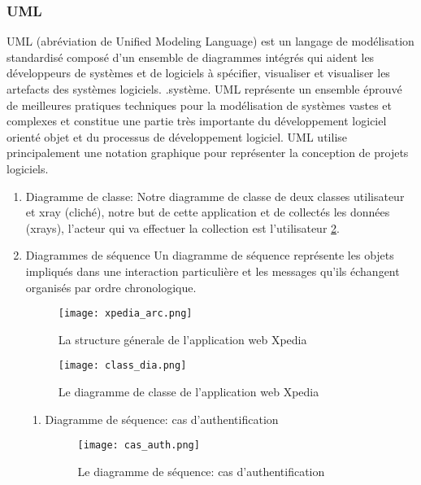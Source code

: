         \subsubsection{UML}
            UML (abréviation de Unified Modeling Language) est un langage de modélisation standardisé composé d'un ensemble de diagrammes intégrés qui aident les développeurs de systèmes et de logiciels à spécifier, visualiser et visualiser les artefacts des systèmes logiciels. .système. UML représente un ensemble éprouvé de meilleures pratiques techniques pour la modélisation de systèmes vastes et complexes et constitue une partie très importante du développement logiciel orienté objet et du processus de développement logiciel. UML utilise principalement une notation graphique pour représenter la conception de projets logiciels.
            \begin{enumerate}
                \item Diagramme de classe:
                Notre diagramme de classe de  deux classes utilisateur et xray (cliché), notre but de cette application et de collectés les données (xrays), l'acteur qui va effectuer la collection est l'utilisateur \ref{fig:class_dia}.

                \item Diagrammes de séquence
                Un diagramme de séquence représente les objets impliqués dans une interaction particulière et les messages qu'ils échangent organisés par ordre chronologique.

        \begin{figure}[H]
            \centering
            \texttt{[image: xpedia\_arc.png]}
            \caption{La structure génerale de l'application web Xpedia}\label{fig:xpedia_arc}
        \end{figure}
                
                
                \begin{figure}[H]
                    \centering
                    \texttt{[image: class\_dia.png]}
                    \caption{Le diagramme de classe de l'application web Xpedia}\label{fig:class_dia}
                \end{figure}

                
                \begin{enumerate}
                    \item Diagramme de séquence: cas d'authentification
                    \begin{figure}[H]
                        \centering
                        \texttt{[image: cas\_auth.png]}
                        \caption{Le diagramme de séquence: cas d'authentification}\label{fig:cas_auth}
                    \end{figure}


\end{enumerate}
\end{enumerate}
